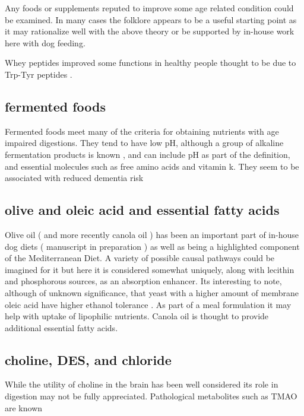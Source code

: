 Any foods or supplements reputed to improve some age
related condition could be examined. In many cases
the folklore appears to be a useful starting point
as it may rationalize well with the above theory or
be supported by in-house work here with dog feeding. 

Whey peptides improved some functions in healthy people 
thought to be due to Trp-Tyr peptides
\cite{Kita_Obara_Kondo_Effect_Supplementation_2018}.

\subsection{ fermented foods}

Fermented foods meet many of the criteria for obtaining nutrients
with age impaired digestions. They tend to have low pH, 
although a group of alkaline fermentation products is known
\cite{OwusuKwarteng_Agyei_Akabanda_Plant_Based_Alkaline_Fermented_2022}
,
and can
include pH as part of the definition, and essential molecules  such as free
amino acids and vitamin k. 
They seem to be associated with reduced dementia risk
\cite{PorrasGarcia_Calderon_GavalaGonzalez_Potential_neuroprotective_effects_2023}

\subsection{ olive and oleic acid and essential fatty acids } 
Olive oil ( and more recently canola oil )
 has been an important part of in-house dog diets 
( manuscript in preparation ) as well as being a highlighted
component of the Mediterranean Diet. A variety of possible causal
pathways could be imagined for it but here it is considered
somewhat uniquely, along with lecithin and phosphorous sources,
as an absorption enhancer. 
Its interesting to note, although of unknown significance, that
yeast with a higher amount of membrane oleic acid have higher
ethanol tolerance
\cite{You_Rosenfield_Knipple_Ethanol_Tolerance_2003}.
As part of a meal formulation it may help with uptake of
lipophilic nutrients.
Canola oil is thought to provide additional essential fatty
acids. 

\subsection{ choline,  DES,  and chloride }

While the utility of choline in the brain has been well considered
its role in digestion may not be fully appreciated. Pathological
metabolites such as TMAO are known 

